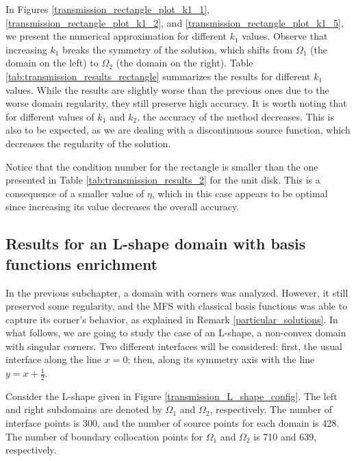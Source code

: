 In Figures \ref{transmission_rectangle_plot_k1_1}, \ref{transmission_rectangle_plot_k1_2}, and \ref{transmission_rectangle_plot_k1_5}, we present the numerical approximation for different \(k_1\) values. Observe that increasing \(k_1\) breaks the symmetry of the solution, which shifts from \(\Omega_1\) (the domain on the left) to \(\Omega_2\) (the domain on the right). Table \ref{tab:transmission_results_rectangle} summarizes the results for different \(k_1\) values. While the results are slightly worse than the previous ones due to the worse domain regularity, they still preserve high accuracy. It is worth noting that for different values of \(k_1\) and \(k_2\), the accuracy of the method decreases. This is also to be expected, as we are dealing with a discontinuous source function, which decreases the regularity of the solution.

Notice that the condition number for the rectangle is smaller than the one presented in Table \ref{tab:transmission_results_2} for the unit disk. This is a consequence of a smaller value of \(\eta\), which in this case appears to be optimal since increasing its value decreases the overall accuracy.

\subsection{Results for an L-shape domain with basis functions enrichment}

In the previous subchapter, a domain with corners was analyzed. However, it still preserved some regularity, and the \ac{MFS} with classical basis functions was able to capture its corner's behavior, as explained in Remark \ref{particular_solutions}. In what follows, we are going to study the case of an L-shape, a non-convex domain with singular corners. Two different interfaces will be considered: first, the usual interface along the line \(x=0\); then, along its symmetry axis with the line \(y=x+\frac{1}{2}\).

Consider the L-shape given in Figure \ref{transmission_L_shape_config}. The left and right subdomains are denoted by \(\Omega_1\) and \(\Omega_2\), respectively. The number of interface points is 300, and the number of source points for each domain is 428. The number of boundary collocation points for \(\Omega_1\) and \(\Omega_2\) is 710 and 639, respectively.


